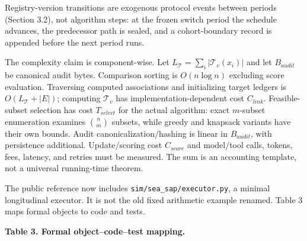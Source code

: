\documentclass[
  11pt]{article}
\begin{document}
Registry-version transitions are exogenous protocol events between
periods (Section 3.2), not algorithm steps: at the frozen switch period
the schedule advances, the predecessor path is sealed, and a
cohort-boundary record is appended before the next period runs.

The complexity claim is component-wise. Let
\(L_{\mathcal T}=\sum_i|\mathcal T_v(x_i)|\) and let \(B_{audit}\) be
canonical audit bytes. Comparison sorting is \(O(n\log n)\) excluding
score evaluation. Traversing computed associations and initializing
target ledgers is \(O(L_{\mathcal T}+|E|)\); computing \(\mathcal T_v\)
has implementation-dependent cost \(C_{link}\). Feasible-subset
selection has cost \(T_{select}\) for the actual algorithm: exact
\(m\)-subset enumeration examines \(\binom nm\) subsets, while greedy
and knapsack variants have their own bounds. Audit
canonicalization/hashing is linear in \(B_{audit}\), with persistence
additional. Update/scoring cost \(C_{score}\) and model/tool calls,
tokens, fees, latency, and retries must be measured. The sum is an
accounting template, not a universal running-time theorem.

The public reference now includes \texttt{sim/sea\_sap/executor.py}, a
minimal longitudinal executor. It is not the old fixed arithmetic
example renamed. Table 3 maps formal objects to code and tests.

\textbf{Table 3. Formal object--code--test mapping.}
\end{document}

